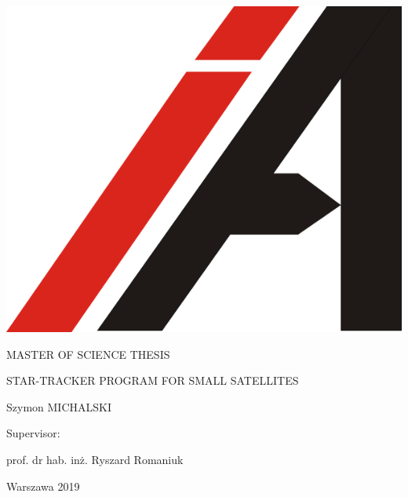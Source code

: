 \documentclass[12pt,a4paper,twoside]{article}
\begin{document}
\begin{titlepage}
	\hspace{1cm}
	\includegraphics[scale=1]{ia_600_600.png}
	\par
	\vspace{2cm}
	MASTER OF SCIENCE THESIS\par
	\vspace{0.2cm}
	{\huge STAR-TRACKER PROGRAM FOR SMALL SATELLITES\par}
	\vspace{0.2cm}
	{\large Szymon MICHALSKI\par}
	\vspace{3cm}
	\begin{flushright}
	Supervisor:\par
	prof. dr hab. inż. Ryszard Romaniuk\par
	\end{flushright}
	\vspace{6cm}
	{\large Warszawa 2019\par}
\end{titlepage}

\newpage
\thispagestyle{empty}
\phantom{a}
\vfill
\newpage
\thispagestyle{empty}

\begin{abstract}
Last years directed space industry towards small satellites. Many countries, which did not have possibility to enter this branch of industry before, now create their own solutions. The goal of this work is to create fully functioning star-tracker software eligible to be used in future satellites as Polish solution of determination of satellite attitude as well as research of possible usage of off-the-shelf embedded computer with GPU - NVIDIA Jetson TX2. Work contains also description of individual parts and variants of solutions connected with star-tracker.
\end{abstract}
\end{document}
